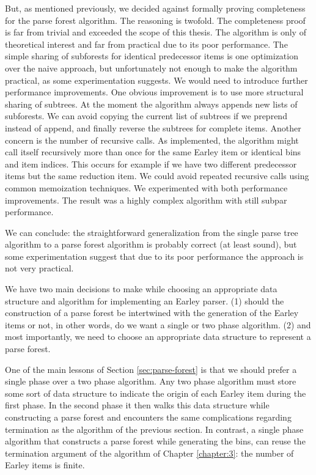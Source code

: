 \begin{isabellebody}
\begin{isamarkuptext}
But, as mentioned previously, we decided against formally proving completeness for the parse forest algorithm. The
reasoning is twofold. The completeness proof is far from trivial and exceeded the scope of this thesis.
The algorithm is only of theoretical interest and far from practical due to its poor performance.
The simple sharing of subforests for identical predecessor items is one optimization over the naive approach, but unfortunately
not enough to make the algorithm practical, as some experimentation suggests. We would need to introduce
further performance improvements. One obvious improvement is to use more structural sharing of subtrees.
At the moment the algorithm always appends new lists of subforests. We can avoid copying the current list
of subtrees if we preprend instead of append, and finally reverse the subtrees for complete items. 
Another concern is the number of recursive calls. As implemented, the algorithm might call itself recursively more than
once for the same Earley item or identical bins and item indices. This occurs for example if we have
two different predecessor items but the same reduction item. We could avoid repeated recursive calls using
common memoization techniques. We experimented with both performance improvements. The result was a
highly complex algorithm with still subpar performance. 

We can conclude: the straightforward generalization from the single parse tree algorithm to a parse
forest algorithm is probably correct (at least sound), but some experimentation suggest that due to its
poor performance the approach is not very practical.%
\end{isamarkuptext}\isamarkuptrue%
%
\isadelimdocument
%
\endisadelimdocument
%
\isatagdocument
%
\isamarkuptrue%
%
\endisatagdocument
{\isafolddocument}%
%
\isadelimdocument
%
\endisadelimdocument
%
\begin{isamarkuptext}%
We have two main decisions to make while choosing an appropriate data structure and algorithm for implementing
an Earley parser. (1) should the construction of a parse forest be intertwined with the generation of the
Earley items or not, in other words, do we want a single or two phase algorithm. (2) and most importantly,
we need to choose an appropriate data structure to represent a parse forest.

One of the main lessons of Section \ref{sec:parse-forest} is that we should prefer a single phase over a two
phase algorithm. Any two phase algorithm must store some sort of data structure to indicate the origin
of each Earley item during the first phase. In the second phase it then walks this data structure while
constructing a parse forest and encounters the same complications regarding termination as the algorithm
of the previous section. In contrast, a single phase algorithm that constructs a parse forest while
generating the bins, can reuse the termination argument of the algorithm of Chapter \ref{chapter:3}: the
number of Earley items is finite.


\end{isamarkuptext}
\end{isabellebody}
